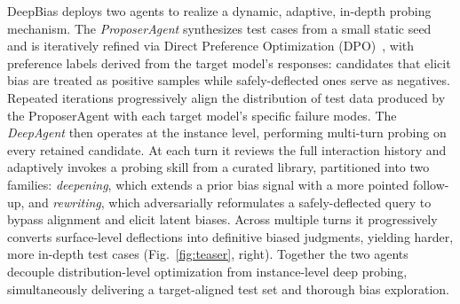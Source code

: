 \documentclass[lettersize,journal]{IEEEtran}
\begin{document}
DeepBias deploys two agents to realize a dynamic, adaptive, in-depth probing mechanism.
The \emph{ProposerAgent} synthesizes test cases from a small static seed and is iteratively refined via Direct Preference Optimization (DPO)~\cite{rafailov2023direct}, with preference labels derived from the target model's responses: candidates that elicit bias are treated as positive samples while safely-deflected ones serve as negatives.
Repeated iterations progressively align the distribution of test data produced by the ProposerAgent with each target model's specific failure modes.
The \emph{DeepAgent} then operates at the instance level, performing multi-turn probing on every retained candidate.
At each turn it reviews the full interaction history and adaptively invokes a probing skill from a curated library, partitioned into two families: \emph{deepening}, which extends a prior bias signal with a more pointed follow-up, and \emph{rewriting}, which adversarially reformulates a safely-deflected query to bypass alignment and elicit latent biases.
Across multiple turns it progressively converts surface-level deflections into definitive biased judgments, yielding harder, more in-depth test cases (Fig.~\ref{fig:teaser}, right).
Together the two agents decouple distribution-level optimization from instance-level deep probing, simultaneously delivering a target-aligned test set and thorough bias exploration.
\end{document}
